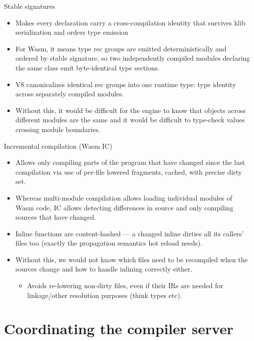 \documentclass[10pt,presentation]{beamer}
\begin{document}
\begin{frame}[label={sec:org08edd6b}]{Stable signatures}
\begin{itemize}
\item Makes every declaration carry a cross-compilation identity that
survives klib serialization and orders type emission
\item For Wasm, it means type rec groups are emitted deterministically and
ordered by stable signature, so two independently compiled modules
declaring the same class emit \alert{byte-identical} type sections.
\item V8 canonicalizes identical rec groups into one runtime type:
\alert{type identity across separately compiled modules}.
\item Without this, it would be difficult for the engine to know that
objects across different modules are the same and it would be
difficult to type-check values crossing module boundaries.
\end{itemize}
\end{frame}
\begin{frame}[label={sec:org75228f6}]{Incremental compilation (Wasm IC)}
\begin{itemize}
\item Allows only compiling parts of the program that have changed since
the last compilation via use of per-file lowered fragments, cached,
with precise dirty set.
\item Whereas multi-module compilation allows loading individual modules
of Wasm code, IC allows detecting differences in source and only
compiling sources that have changed.
\item Inline functions are content-hashed — a changed inline dirties all
its \alert{callers' files} too (exactly the propagation semantics hot
reload needs).
\item Without this, we would not know which files need to be recompiled
when the sources change and how to handle inlining correctly either.
\begin{itemize}
\item Avoids re-lowering non-dirty files, even if their IRs are needed
for linkage/other resolution purposes (think types etc).
\end{itemize}
\end{itemize}
\end{frame}
\section*{Coordinating the compiler server}
\label{sec:orgcfe4cb0}
\end{document}
